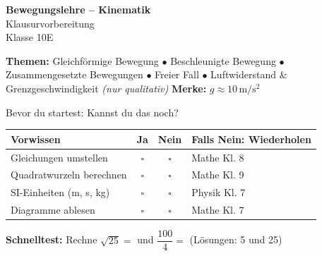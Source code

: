 \documentclass[11pt,a4paper]{article}
\begin{document}
\begin{center}
{\Huge\bfseries\color{physikblue} Bewegungslehre -- Kinematik}\\[0.3cm]
{\large Klausurvorbereitung}\\[0.2cm]
{\large Klasse 10E}
\end{center}

\vspace{0.5cm}

\begin{tcolorbox}[colback=lightblue, colframe=physikblue, boxrule=1pt]
\textbf{Themen:} Gleichförmige Bewegung $\bullet$ Beschleunigte Bewegung $\bullet$ Zusammengesetzte Bewegungen $\bullet$ Freier Fall $\bullet$ Luftwiderstand \& Grenzgeschwindigkeit \textit{(nur qualitativ)}
\hfill \textbf{Merke:} $g \approx 10\,\mathrm{m/s^2}$
\end{tcolorbox}

\vspace{0.5cm}

\begin{tcolorbox}[colback=tipporange!10, colframe=tipporange, boxrule=1pt, title=\textbf{Vorwissens-Check: Bin ich bereit?}]
Bevor du startest: Kannst du das noch?

\begin{tabular}{|p{7cm}|c|c|p{4cm}|}
\hline
\rowcolor{tipporange!20}
\textbf{Vorwissen} & \textbf{Ja} & \textbf{Nein} & \textbf{Falls Nein: Wiederholen} \\
\hline
Gleichungen umstellen & $\square$ & $\square$ & Mathe Kl. 8 \\
\hline
Quadratwurzeln berechnen & $\square$ & $\square$ & Mathe Kl. 9 \\
\hline
SI-Einheiten (m, s, kg) & $\square$ & $\square$ & Physik Kl. 7 \\
\hline
Diagramme ablesen & $\square$ & $\square$ & Mathe Kl. 7 \\
\hline
\end{tabular}

\vspace{0.3cm}
\textbf{Schnelltest:} Rechne $\sqrt{25} = $ \underline{\hspace{1cm}} \quad und \quad $\dfrac{100}{4} = $ \underline{\hspace{1cm}}
\hfill {\small (Lösungen: 5 und 25)}
\end{tcolorbox}

\vspace{0.3cm}
\tableofcontents
\newpage

\end{document}
